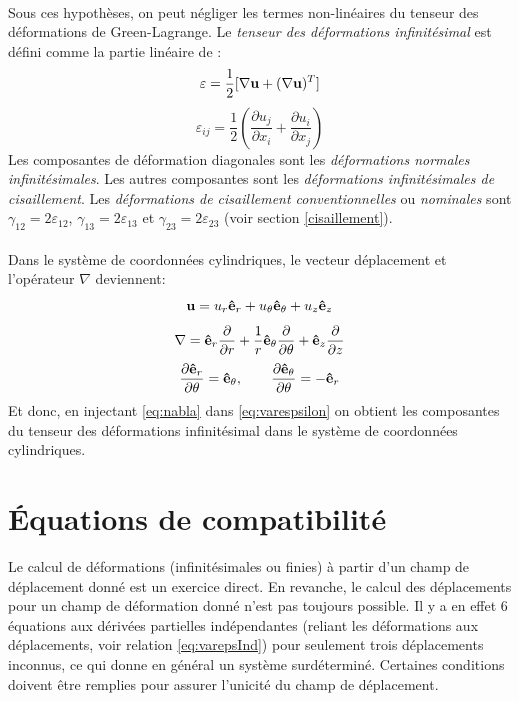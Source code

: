 \paragraph{}
Sous ces hypothèses, on peut négliger les termes non-linéaires du tenseur des déformations de Green-Lagrange. Le \emph{tenseur des déformations infinitésimal} est défini comme la partie linéaire de :
\begin{equation}
\label{eq:varespsilon}
\varepsilon=\frac{1}{2}[\nabla\textbf{u}+(\nabla\textbf{u})^T]
\end{equation}
\begin{equation}
\label{eq:varepsInd}
\varepsilon_{ij}=\frac{1}{2}\left(\frac{\partial u_j}{\partial x_i}+\frac{\partial u_i}{\partial x_j}\right)
\end{equation}
Les composantes de déformation diagonales sont les \emph{déformations normales infinitésimales}. Les autres composantes sont les \emph{déformations infinitésimales de cisaillement}. Les \emph{déformations de cisaillement conventionnelles} ou \emph{nominales} sont $\gamma_{12}=2\varepsilon_{12}$, $\gamma_{13}=2\varepsilon_{13}$ et $\gamma_{23}=2\varepsilon_{23}$ (voir section \ref{cisaillement}).
\paragraph{}
Dans le système de coordonnées cylindriques, le vecteur déplacement et l'opérateur $\nabla$ deviennent:
$$\textbf{u}=u_r\textbf{ê}_r+u_{\theta}\textbf{ê}_{\theta}+u_z\textbf{ê}_z$$
\begin{equation}\label{eq:nabla}\nabla=\textbf{ê}_r\frac{\partial}{\partial r}+\frac{1}{r}\textbf{ê}_{\theta}\frac{\partial}{\partial \theta}+\textbf{ê}_z\frac{\partial}{\partial z}\end{equation}
$$\frac{\partial \textbf{ê}_r}{\partial \theta}=\textbf{ê}_{\theta},\qquad \frac{\partial \textbf{ê}_{\theta}}{\partial \theta}=-\textbf{ê}_{r} $$
Et donc, en injectant \eqref{eq:nabla} dans \eqref{eq:varespsilon} on obtient les composantes du tenseur des déformations infinitésimal dans le système de coordonnées cylindriques.

\section{\'Equations de compatibilité}
Le calcul de déformations (infinitésimales ou finies) à partir d'un champ de déplacement donné est un exercice direct. En revanche, le calcul des déplacements pour un champ de déformation donné n'est pas toujours possible. Il y a en effet 6 équations aux dérivées partielles indépendantes (reliant les déformations aux déplacements, voir relation \eqref{eq:varepsInd}) pour seulement trois déplacements inconnus, ce qui donne en général un système surdéterminé. Certaines conditions doivent être remplies pour assurer l'unicité du champ de déplacement.
